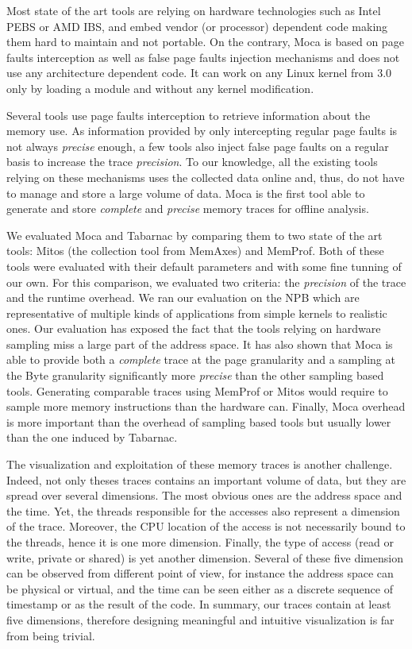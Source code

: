 Most state of the art tools are relying on hardware technologies such as \gls{Intel} \gls{PEBS} or \gls{AMD} \gls{IBS}, and embed vendor (or processor) dependent code making them hard to maintain and not portable.
On the contrary, \gls{Moca} is based on page faults interception as well as false page faults injection mechanisms and does not use any architecture dependent code.
It can work on any \gls{Linux} kernel from $3.0$ only by loading a module and without any kernel modification.

Several tools use page faults interception to retrieve information about the memory use.
As information provided by only intercepting regular page faults is not always \emph{precise} enough, a few tools also inject false page faults on a regular basis to increase the trace \emph{precision}.
To our knowledge, all the existing tools relying on these mechanisms uses the collected data online and, thus, do not have to manage and store a large volume of data.
\gls{Moca} is the first tool able to generate and store \emph{complete} and \emph{precise} memory traces for offline analysis.

We evaluated \gls{Moca} and \gls{Tabarnac} by comparing them to two state of the art tools: \gls{Mitos} (the collection tool from \gls{MemAxes}) and \gls{MemProf}.
Both of these tools were evaluated with their default parameters and with some fine tunning of our own.
For this comparison, we evaluated two criteria: the \emph{precision} of the trace and the runtime overhead.
We ran our evaluation on the \gls{NPB} which are representative of multiple kinds of applications from simple kernels to realistic ones.
Our evaluation has exposed the fact that the tools relying on hardware sampling miss a large part of the address space.
It has also shown that \gls{Moca} is able to provide both a \emph{complete} trace at the page granularity and a sampling at the Byte granularity significantly more \emph{precise} than the other sampling based tools.
Generating comparable traces using \gls{MemProf} or \gls{Mitos} would require to sample more memory instructions than the hardware can.
Finally, \gls{Moca} overhead is more important than the overhead of sampling based tools but usually lower than the one induced by \gls{Tabarnac}.

The visualization and exploitation of these memory traces is another challenge.
Indeed, not only theses traces contains an important volume of data, but they are spread over several dimensions.
The most obvious ones are the address space and the time.
Yet, the threads responsible for the accesses also represent a dimension of the trace.
Moreover, the \gls{CPU} location of the access is not necessarily bound to the threads, hence it is one more dimension.
Finally, the type of access (read or write, private or shared) is yet another dimension.
Several of these five dimension can be observed from different point of view, for instance the address space can be physical or virtual,  and the time can be seen either as a discrete sequence of timestamp or as the result of the code.
In summary, our traces contain at least five dimensions, therefore designing meaningful and intuitive visualization is far from being trivial.

